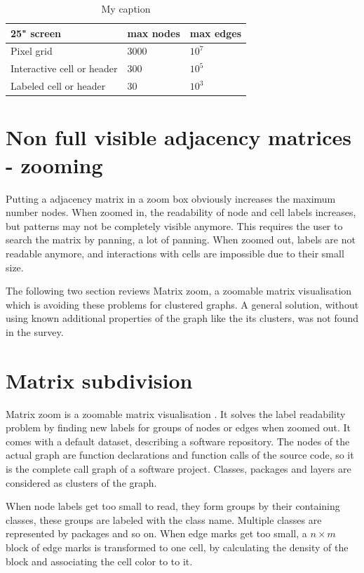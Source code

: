  
\begin{table}[]
\centering
\begin{tabular}{|l|l|l|}
\hline
25" screen                 & max nodes & max edges                \\ \hline
Pixel grid                 & 3000      & $10^7$                     \\ \hline
Interactive cell or header & 300       & $10^5$                     \\ \hline
Labeled cell or header     & 30        & $10^3$                     \\ \hline
\end{tabular}
\caption{My caption}
\label{my-label}
\end{table}



\section{Non full visible adjacency matrices - zooming}
Putting a adjacency matrix in a zoom box obviously increases the maximum number nodes. 
When zoomed in, the readability of node and cell labels increases, but patterns may not be completely visible anymore. This requires the user to search the matrix by panning, a lot of panning. When zoomed out, labels are not readable anymore, and interactions with cells are impossible due to their small size. 

The following two section reviews Matrix zoom, a zoomable matrix visualisation which is avoiding these problems for clustered graphs. A general solution, without using known additional properties of the graph like the its clusters, was not found in the survey.

\section{Matrix subdivision}

Matrix zoom is a zoomable matrix visualisation \cite{ham}. It solves the label readability problem by finding new labels for groups of nodes or edges when zoomed out. It comes with a default dataset, describing a software repository. The nodes of the actual graph are function declarations and function calls of the source code, so it is the complete call graph of a software project. Classes, packages and layers are considered as clusters of the graph. 

When node labels get too small to read, they form groups by their containing classes, these groups are labeled with the class name. Multiple classes are represented by packages and so on. When edge marks get too small, a $n \times m$ block of edge marks is transformed to one cell, by calculating the density of the block and associating the cell color to to it.

